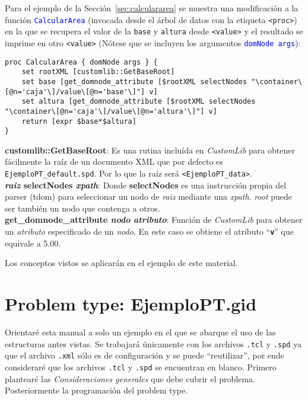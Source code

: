 \documentclass[10pt, a4paper, twocolumn]{article}
\begin{document}
Para el ejemplo de la Sección~\ref{sec:calculararea} se muestra una modificación a la función \textcolor{blue}{\texttt{CalcularArea}} (invocada desde el árbol de datos con la etiqueta \texttt{<proc>}) en la que se recupera el valor de la \texttt{base} y \texttt{altura} desde \texttt{<value>} y el resultado se imprime en otro \texttt{<value>} (Nótese que se incluyen los argumentos \textcolor{blue}{\texttt{domNode args}}):

\newpage

\lstset{language=tcl} 
\begin{lstlisting}[caption={Cálculo del área obteniendo los valores desde el archivo \texttt{.spd} usando las funciones de \texttt{CustomLib}.}]
proc CalcularArea { domNode args } {
	set rootXML [customlib::GetBaseRoot]
	set base [get_domnode_attribute [$rootXML selectNodes "\container\[@n='caja'\]/value\[@n='base'\]"] v]
	set altura [get_domnode_attribute [$rootXML selectNodes "\container\[@n='caja'\]/value\[@n='altura'\]"] v]
	return [expr $base*$altura]
}
\end{lstlisting} 

\textbf{customlib::GetBaseRoot}: Es una rutina incluída en \textit{CustomLib} para obtener fácilmente la raíz de un documento XML que por defecto es \texttt{EjemploPT\_default.spd}. Por lo que la raíz será \texttt{<EjemploPT\_data>}.\\
\textbf{\textit{raiz} selectNodes \textit{xpath}}: Donde \textbf{selectNodes} es una instrucción propia del parser (tdom) para seleccionar un nodo de \textit{raiz} mediante una \textit{xpath}. \textit{root} puede ser también un nodo que contenga a otros.\\
\textbf{get\_domnode\_attribute \textit{nodo} \textit{atributo}}: Función  de \textit{CustomLib} para obtener un \textit{atributo} especificado de un \textit{nodo}. En este caso se obtiene el atributo ``\texttt{\textbf{v}}'' que equivale a 5.00.

Los conceptos vistos se aplicarán en el ejemplo de este material.

\section{Problem type: EjemploPT.gid}

Orientaré esta manual a solo un ejemplo en el que se abarque el uso de las estructuras antes vistas. Se trabajará únicamente con los archivos \texttt{.tcl} y \texttt{.spd} ya que el archivo \texttt{.xml} sólo es de configuración y se puede ``reutilizar'', por ende consideraré que los archivos \texttt{.tcl} y \texttt{.spd} se encuentran en blanco. Primero plantearé las \textit{Consideraciones generales} que debe cubrir el problema. Posteriormente la programación del problem type. 
\end{document}
